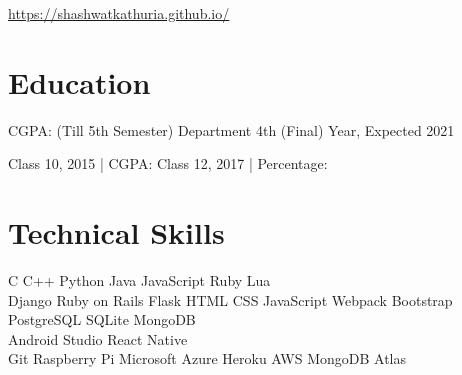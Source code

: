 \documentclass[]{deedy-resume-openfont}
\begin{document}
%
%

%
%


\url{https://shashwatkathuria.github.io/}

%
%

\section{Education}
\begin{large}
    CGPA: (Till 5th Semester)
    \textbullet{}
    Department 
    \textbullet{}
    4th (Final) Year, Expected 2021
\end{large}
\sectionsep

\begin{large}
    Class 10, 2015 | CGPA: 
    \textbullet{}
    Class 12, 2017 | Percentage: 
\end{large}
\sectionsep

%
%

\section{Technical Skills}
\begin{large}
 C \textbullet{}   C++ \textbullet{} Python \textbullet{} Java \textbullet{}
JavaScript \textbullet{} Ruby \textbullet{} Lua \\

 Django \textbullet{} Ruby on Rails \textbullet{} Flask \textbullet{}
 HTML \textbullet{} CSS \textbullet{} JavaScript \textbullet{} Webpack \textbullet{} Bootstrap \\ \hspace{36mm} \textbullet{} PostgreSQL \textbullet{} SQLite \textbullet{} MongoDB \\

 Android Studio \textbullet{} React Native \\

 Git \textbullet{} Raspberry Pi \textbullet{} Microsoft Azure \textbullet{} Heroku \textbullet{} AWS \textbullet{} MongoDB Atlas \\

\end{large}
\sectionsep
\end{document}
